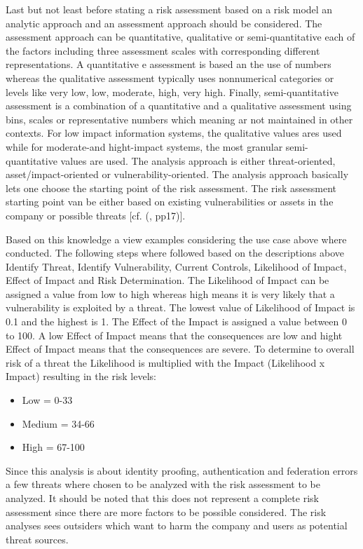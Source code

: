 Last but not least before stating a risk assessment based on a risk model an analytic approach and an assessment approach should be considered. The assessment approach can be quantitative, qualitative or semi-quantitative each of the factors including three assessment scales with corresponding different representations. A quantitative e assessment is based an the use of numbers whereas the qualitative assessment typically uses nonnumerical categories or levels like very low, low, moderate, high, very high. Finally, semi-quantitative assessment is a combination of a quantitative and a qualitative assessment using bins, scales or representative numbers which meaning ar not maintained in other contexts. For low impact information systems, the qualitative values ares used while for moderate-and hight-impact systems, the most granular semi-quantitative values are used. The analysis approach is either threat-oriented, asset/impact-oriented or vulnerability-oriented. The analysis approach basically lets one choose the starting point of the risk assessment. The risk assessment starting point van be either based on existing vulnerabilities or assets in the company or possible threats  [cf. (\cite{NIST:2012:GCRA}, pp17)].

Based on this knowledge a view examples considering the use case above where conducted. The following steps where followed based on the descriptions above Identify Threat, Identify Vulnerability, Current Controls, Likelihood of Impact, Effect of Impact and Risk Determination. The Likelihood of Impact can be assigned a value from low to high whereas high means it is very likely that a vulnerability is exploited by a threat. The lowest value of Likelihood of Impact is 0.1 and the highest is 1. The Effect of the Impact is assigned a value between 0 to 100. A low Effect of Impact means that the consequences are low and hight Effect of Impact means that the consequences are severe. To determine to overall risk of a threat the Likelihood is multiplied with the Impact (Likelihood x Impact) resulting in the risk levels:

\begin{itemize}
	\item Low =     0-33
	\item Medium = 34-66
	\item High =   67-100
\end{itemize}

Since this analysis is about identity proofing, authentication and federation errors a few threats  where chosen to be analyzed with the risk assessment to be analyzed. It should be noted that this does not represent a complete risk assessment since there are more factors to be possible considered. The risk analyses sees outsiders which want to harm the company and users as potential threat sources. 

